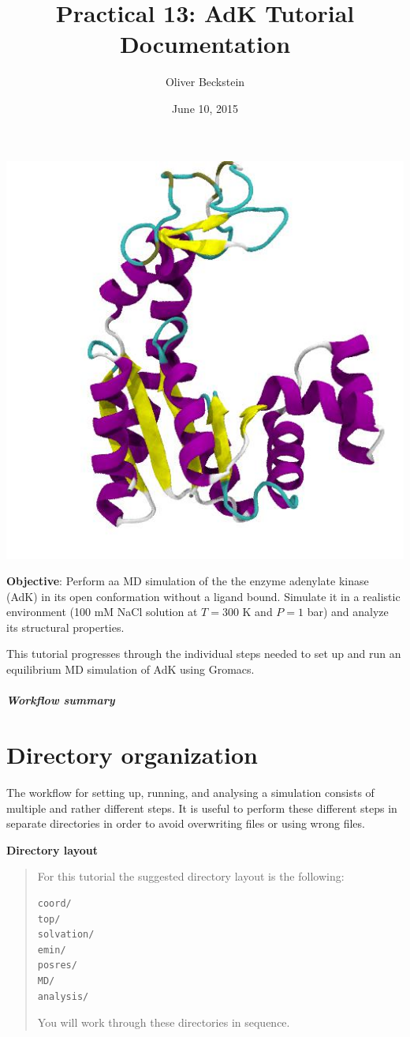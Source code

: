 \documentclass[letterpaper,10pt,english]{sphinxmanual}
\title{Practical 13: AdK Tutorial Documentation}
\date{June 10, 2015}
\author{Oliver Beckstein}
\begin{document}
\maketitle
\tableofcontents
{}\label{index::doc}


{\hfill\includegraphics[width=0.300\linewidth]{adk_secondary.jpg}}

\textbf{Objective}: Perform aa MD simulation of the the enzyme adenylate kinase
(AdK) in its open conformation without a ligand bound. Simulate it in
a realistic environment (100 mM NaCl solution at \(T = 300\) K and
\(P = 1\) bar) and analyze its structural properties.

This tutorial progresses through the individual steps needed to set up
and run an equilibrium MD simulation of AdK using Gromacs.
\paragraph{Workflow summary}


\chapter{Directory organization}
\label{directory_organization:directory-organization}\label{directory_organization::doc}\label{directory_organization:tutorial-simulating-adk-with-gromacs}
The workflow for setting up, running, and analysing a simulation
consists of multiple and rather different steps. It is useful to
perform these different steps in separate directories in order to
avoid overwriting files or using wrong files.

\textbf{Directory layout}
\begin{quote}

For this tutorial the suggested directory layout is the following:

\begin{Verbatim}[commandchars=\\\{\}]
coord/
top/
solvation/
emin/
posres/
MD/
analysis/
\end{Verbatim}

You will work through these directories in sequence.
\end{quote}
\end{document}
